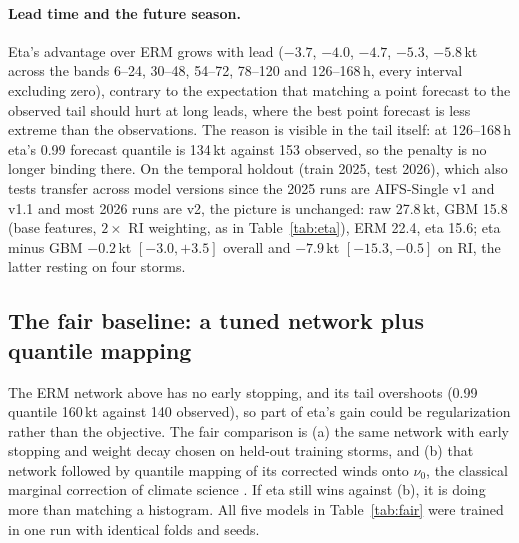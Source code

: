 \documentclass[11pt]{article}
\begin{document}
\paragraph{Lead time and the future season.} Eta's advantage over ERM grows with lead
($-3.7$, $-4.0$, $-4.7$, $-5.3$, $-5.8$\,kt across the bands 6--24, 30--48, 54--72, 78--120 and
126--168\,h, every interval excluding zero), contrary to the expectation that matching a point
forecast to the observed tail should hurt at long leads, where the best point forecast is less
extreme than the observations. The reason is visible in the tail itself: at 126--168\,h eta's
0.99 forecast quantile is 134\,kt against 153 observed, so the penalty is no longer binding
there. On the temporal holdout (train 2025, test 2026), which also tests transfer across model
versions since the 2025 runs are AIFS-Single v1 and v1.1 and most 2026 runs are v2, the picture is
unchanged: raw 27.8\,kt, GBM 15.8 (base features, $2\times$ RI weighting, as in Table~\ref{tab:eta}),
ERM 22.4, eta 15.6; eta minus GBM $-0.2$\,kt $[-3.0, +3.5]$ overall and $-7.9$\,kt
$[-15.3, -0.5]$ on RI, the latter resting on four storms.

\subsection{The fair baseline: a tuned network plus quantile mapping}\label{sec:fair}

The ERM network above has no early stopping, and its tail overshoots (0.99 quantile 160\,kt
against 140 observed), so part of eta's gain could be regularization rather than the objective.
The fair comparison is (a) the same network with early stopping and
weight decay chosen on held-out training storms, and (b) that network followed by quantile
mapping of its corrected winds onto $\nu_0$, the classical marginal correction of climate science
\citep{maraun2013inflation}. If eta still wins against (b), it is doing more than matching a
histogram. All five models in Table~\ref{tab:fair} were trained in one run with identical folds
and seeds.
\end{document}
